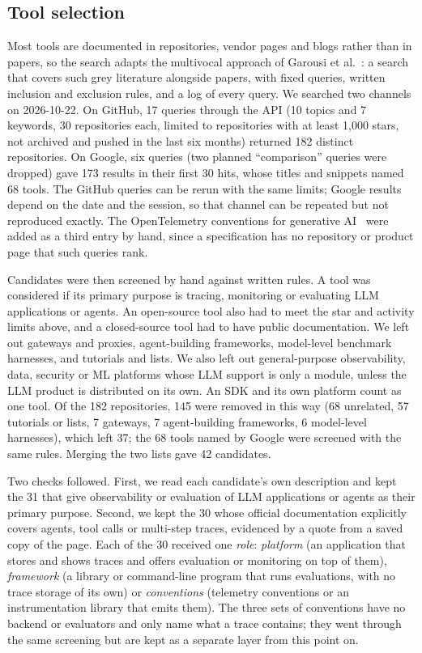 \documentclass[conference]{IEEEtran}
\begin{document}
\subsection{Tool selection}\label{sec:selection}
Most tools are documented in repositories, vendor pages and blogs rather than in papers, so the search adapts the multivocal approach of Garousi et al.~\cite{garousi2019guidelines}: a search that covers such grey literature alongside papers, with fixed queries, written inclusion and exclusion rules, and a log of every query. We searched two channels on 2026-10-22. On GitHub, 17 queries through the API (10 topics and 7 keywords, 30 repositories each, limited to repositories with at least 1,000 stars, not archived and pushed in the last six months) returned 182 distinct repositories. On Google, six queries (two planned ``comparison'' queries were dropped) gave 173 results in their first 30 hits, whose titles and snippets named 68 tools. The GitHub queries can be rerun with the same limits; Google results depend on the date and the session, so that channel can be repeated but not reproduced exactly. The OpenTelemetry conventions for generative AI~\cite{otelgenai} were added as a third entry by hand, since a specification has no repository or product page that such queries rank.

Candidates were then screened by hand against written rules. A tool was considered if its primary purpose is tracing, monitoring or evaluating LLM applications or agents. An open-source tool also had to meet the star and activity limits above, and a closed-source tool had to have public documentation. We left out gateways and proxies, agent-building frameworks, model-level benchmark harnesses, and tutorials and lists. We also left out general-purpose observability, data, security or ML platforms whose LLM support is only a module, unless the LLM product is distributed on its own. An SDK and its own platform count as one tool. Of the 182 repositories, 145 were removed in this way (68 unrelated, 57 tutorials or lists, 7 gateways, 7 agent-building frameworks, 6 model-level harnesses), which left 37; the 68 tools named by Google were screened with the same rules. Merging the two lists gave 42 candidates.

Two checks followed. First, we read each candidate's own description and kept the 31 that give observability or evaluation of LLM applications or agents as their primary purpose. Second, we kept the 30 whose official documentation explicitly covers agents, tool calls or multi-step traces, evidenced by a quote from a saved copy of the page. Each of the 30 received one \emph{role}: \emph{platform} (an application that stores and shows traces and offers evaluation or monitoring on top of them), \emph{framework} (a library or command-line program that runs evaluations, with no trace storage of its own) or \emph{conventions} (telemetry conventions or an instrumentation library that emits them). The three sets of conventions have no backend or evaluators and only name what a trace contains; they went through the same screening but are kept as a separate layer from this point on.
\end{document}

